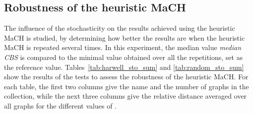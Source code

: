 \documentclass{scrartcl}
\theoremstyle{plain}
\newcommand{\algo}{MaCH}
\newcommand{\cbs}{CBS}
\begin{document}
\subsection{Robustness of the heuristic \algo{}}
\label{subsec:robustness}

The influence of the stochasticity on the results achieved using the heuristic  
\algo{} is studied, by determining how better the results are when the heuristic 
\algo{} is repeated several times. In this experiment, the median value 
\emph{median 
\cbs} is compared to the minimal value obtained over all the repetitions, set 
as the reference value. Tables~\ref{tab:harwell_sto_sum} and 
\ref{tab:random_sto_sum} show the results of the tests to assess the robustness 
of the heuristic \algo{}. For each table, the first two columns give the name 
and the number of graphs in the collection, while the next three columns give 
the 
relative distance averaged over all graphs for the different values of .
\end{document}
